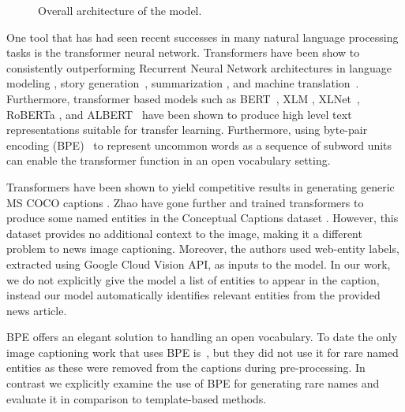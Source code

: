 
\begin{figure*}[t]
    \begin{center}
    \fbox{\rule{0pt}{2in} \rule{.9\linewidth}{0pt}}
    \end{center}
       \caption{Overall architecture of the model.}
    \label{fig:short}
 \end{figure*}

One tool that has had seen recent successes in many natural language processing
tasks is the transformer neural network.
Transformers have been show to consistently
outperforming Recurrent Neural Network architectures in language modeling
\cite{Radford2019LanguageMA},
story generation~\cite{Fan2018HierarchicalNS}, summarization
\cite{Subramanian2019OnEA}, and machine translation~\cite{Bojar2018Findings}.
Furthermore, transformer based models such as BERT~\cite{Devlin2019BERT}, XLM
\cite{Lample2019CrosslingualLM}, XLNet~\cite{Yang2019XLNetGA}, RoBERTa
\cite{Liu2019RoBERTaAR}, and ALBERT~\cite{Lan2019ALBERT} have been shown to
produce high level text representations suitable for transfer learning.
Furthermore, using byte-pair
encoding (BPE)~\cite{Sennrich2015NeuralMT} to represent uncommon words as a
sequence of subword units can enable the transformer function in an open
vocabulary setting.

Transformers have been shown
to yield competitive results in generating generic MS COCO captions
\cite{Zhu2018CaptioningTW, Li2019Boosted}. Zhao \etal
\cite{Zhao2019InformativeIC} have gone further and trained transformers to
produce some named entities in the Conceptual Captions dataset
\cite{Sharma2018ConceptualCA}. However, this dataset provides no additional
context to the image, making it a different problem to news image captioning.
Moreover, the authors used web-entity labels,
extracted using Google Cloud Vision API, as inputs to the model. In our work,
we do not explicitly give the model a list of
entities to appear in the caption, instead our model automatically identifies
relevant entities from the provided news article.

BPE offers an elegant solution to handling an open vocabulary. To date the only
image captioning work that uses BPE is~\cite{Sharma2018ConceptualCA}, but they
did not use it for rare named entities as these were removed from
the captions during pre-processing. In contrast we explicitly examine the use
of BPE for generating rare names and evaluate it in comparison to
template-based methods.

